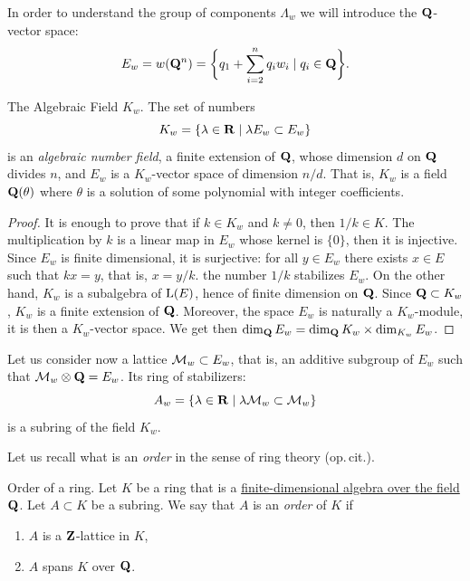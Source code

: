 In order to understand the group of components $\Lambda_w$ we will introduce the $\mathbf{Q}$-vector space:
$$%
  E_w = w(\QQ^n) = \bigg\{ q_1 + \sum_{i=2}^n q_i w_i \mid q_i \in \QQ\bigg\}.
  $$%

\begin{Article}{The Algebraic Field $K_w$.}{\itshape}
  The set of numbers
  $$%
    K_w = \{ \lambda \in \RR \mid \lambda E_w \subset E_w \}
    $$%
  is an \emph{algebraic number field},
  a finite extension of $\mathbf{Q}$,
  whose dimension $d$ on $\mathbf{Q}$ divides $n$,
  and $E_w$ is a $K_w$-vector space of dimension $n/d$.
  That is,
  $K_w$ is a field $\mathbf{Q}(\theta)$ where $\theta$ is a solution of some polynomial with integer coefficients.
\end{Article}

\begin{proof}
  It is enough to prove that if $k\in K_w$  and $k\neq 0$,
  then $1/k\in K$.
  The multiplication by $k$ is a linear map in $E_w$ whose kernel is $\{0\}$,
  then it is injective.
  Since $E_w$ is finite dimensional,
  it is surjective:
  for all $y \in E_w$ there exists $x \in E$ such that $kx=y$,
  that is,
  $x = y/k$.
  the number $1/k$ stabilizes $E_w$.
  On the other hand,
  $K_w$ is a subalgebra of $\operatorname{L}(E)$,
  hence of finite dimension on $\mathbf{Q}$.
  Since $\mathbf{Q} \subset K_w$,
  $K_w$ is a finite extension of $\mathbf{Q}$.
  Moreover,
  the space $E_w$ is naturally a $K_w$-module,
  it is then a $K_w$-vector space.
  We get then  $\dim_{\mathbf{Q}} E_w = \dim_{\mathbf{Q}} K_w \times \dim_{K_w} E_w$.
\end{proof}

Let us consider now a lattice $\mathcal{M}_w \subset E_w$,
that is,
an additive subgroup of $E_w$ such that $\mathcal{M}_w \otimes \mathbf{Q} = E_w$.
Its ring of stabilizers:
$$%
  A_w = \{\lambda \in \RR \mid \lambda \cM_w \subset \cM_w \}
  $$%
is a subring of the field $K_w$.

Let us recall what is  an \emph{order} in the sense of ring theory (op.\,cit.).

\begin{Article}{Order of a ring.}{\itshape}
  Let $K$ be a ring that is a \uline{finite-dimensional algebra over the field $\mathbf{Q}$}.
  Let $A \subset K$ be a subring.
  We say that $A$ is an \emph{order} of $K$ if
  \begin{enumerate}
    \item $A$ is a $\mathbf{Z}$-lattice in $K$,
    \item $A$ spans $K$ over $\mathbf{Q}$.
  \end{enumerate}
\end{Article}


